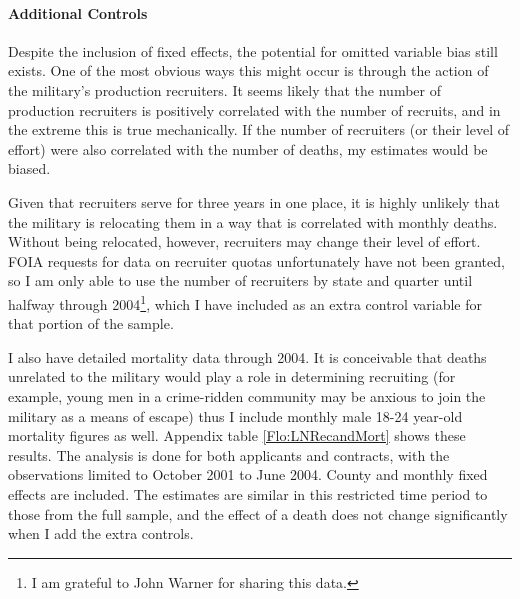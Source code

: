 \documentclass[12pt] {article}
\begin{document}
\paragraph{Additional Controls}

Despite the inclusion of fixed effects, the potential for omitted
variable bias still exists. One of the most obvious ways this might
occur is through the action of the military's production recruiters.
It seems likely that the number of production recruiters is positively
correlated with the number of recruits, and in the extreme this is true mechanically. If the number of recruiters (or their level
of effort) were also correlated with the number of deaths, my estimates
would be biased. 

Given that recruiters serve for three years in one
place, it is highly unlikely that the military is relocating them
in a way that is correlated with monthly deaths. Without being relocated,
however, recruiters may change their level of effort. FOIA requests for data on recruiter quotas unfortunately have not been granted, so I am only able to use the number of recruiters by state and quarter until halfway through 2004\footnote{I am grateful to John Warner for sharing this data.}, which I have included as an extra control variable for that portion of the sample. 

I also have detailed mortality data through 2004. It is conceivable that deaths unrelated to the military would play a role in determining recruiting (for example,
young men in a crime-ridden community may be anxious to join the military
as a means of escape) thus I include monthly male 18-24 year-old mortality figures
as well. Appendix table \ref{Flo:LNRecandMort} shows these results. The
analysis is done for both applicants and contracts, with the observations
limited to October 2001 to June 2004. County and monthly
fixed effects are included. The estimates are similar in this restricted time period to those from the full sample, and the effect of a death does not change significantly when I add the extra controls.  %
\end{document}
